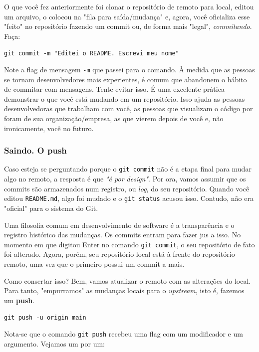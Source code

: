 \documentclass{article}
\begin{document}
  O que você fez anteriormente foi clonar o repositório de remoto para local, editou um arquivo, 
  o colocou na "fila para saída/mudança" e, agora, você oficializa esse "feito" no repositório fazendo um commit ou,
  de forma mais "legal", \textit{commitando}. Faça: 

  \vspace{1ex}
  \texttt{git commit -m "Editei o README. Escrevi meu nome"}
  \vspace{1ex}

  Note a flag de mensagem \texttt{-m} que passei para o comando. À medida que as pessoas se tornam desenvolvedores mais experientes, 
  é comum que abandonem o hábito de commitar com mensagens. Tente evitar isso. É uma excelente prática demonstrar o que você está 
  mudando em um repositório. Isso ajuda as pessoas desenvolvedoras que trabalham com você, as pessoas que visualizam o código por foram
  de sua organização/empresa, as que vierem depois de você e, não ironicamente, você no futuro. 

  \subsubsection{Saindo. O push}

  Caso esteja se perguntando porque o \texttt{git commit} não é a etapa final para mudar algo no remoto, a resposta é que 
  \textit{"é por design"}. Por ora, vamos assumir que os commits são armazenados num registro, ou \textit{log}, do seu repositório. 
  Quando você editou \texttt{README.md}, algo foi mudado e o \texttt{git status} acusou isso. Contudo, não era "oficial" para o 
  sistema do Git. 
  
  Uma filosofia comum em desenvolvimento de software é a transparência e o registro histórico das mudanças. Os commits entram
  para fazer jus a isso. No momento em que digitou Enter no comando \texttt{git commit}, o seu repositório de fato foi alterado. 
  Agora, porém, seu repositório local está à frente do repositório remoto, uma vez que o primeiro possui um commit a mais. 

  Como consertar isso? Bem, vamos atualizar o remoto com as alterações do local. Para tanto, "empurramos" as mudanças locais 
  para o \textit{upstream}, isto é, fazemos um \textbf{push}.

  \vspace{1ex}
  \texttt{git push -u origin main}
  \vspace{1ex}

  Nota-se que o comando \texttt{git push} recebeu uma flag com um modificador e um argumento. Vejamos um por um: 
\end{document}
